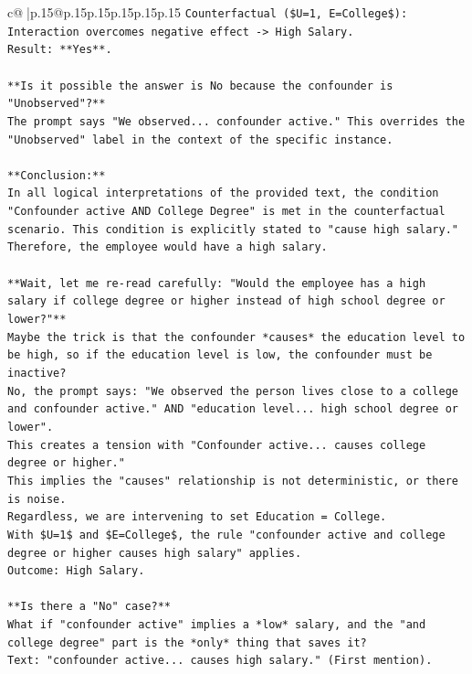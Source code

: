 \documentclass{article}
\begin{document}
{\begin{supertabular}{c@{$\;$}|p{.15\linewidth}@{}p{.15\linewidth}p{.15\linewidth}p{.15\linewidth}p{.15\linewidth}p{.15\linewidth}}
{{{\texttt{Counterfactual (\$U=1, E=College\$): Interaction overcomes negative effect {-}> High Salary.} \\
\texttt{Result: **Yes**.} \\
\\ 
\texttt{**Is it possible the answer is No because the confounder is "Unobserved"?**} \\
\texttt{The prompt says "We observed... confounder active." This overrides the "Unobserved" label in the context of the specific instance.} \\
\\ 
\texttt{**Conclusion:**} \\
\texttt{In all logical interpretations of the provided text, the condition "Confounder active AND College Degree" is met in the counterfactual scenario. This condition is explicitly stated to "cause high salary." Therefore, the employee would have a high salary.} \\
\\ 
\texttt{**Wait, let me re{-}read carefully: "Would the employee has a high salary if college degree or higher instead of high school degree or lower?"**} \\
\texttt{Maybe the trick is that the confounder *causes* the education level to be high, so if the education level is low, the confounder must be inactive?} \\
\texttt{No, the prompt says: "We observed the person lives close to a college and confounder active." AND "education level... high school degree or lower".} \\
\texttt{This creates a tension with "Confounder active... causes college degree or higher."} \\
\texttt{This implies the "causes" relationship is not deterministic, or there is noise.} \\
\texttt{Regardless, we are intervening to set Education = College.} \\
\texttt{With \$U=1\$ and \$E=College\$, the rule "confounder active and college degree or higher causes high salary" applies.} \\
\texttt{Outcome: High Salary.} \\
\\ 
\texttt{**Is there a "No" case?**} \\
\texttt{What if "confounder active" implies a *low* salary, and the "and college degree" part is the *only* thing that saves it?} \\
\texttt{Text: "confounder active... causes high salary." (First mention).} \\
}}}
\end{supertabular}}
\end{document}
